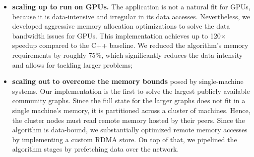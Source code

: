 \begin{itemize}
\item \textbf{scaling up to run on GPUs.}
The application is not a natural fit for GPUs, because it is data-intensive and
irregular in its data accesses. Nevertheless, we developed aggressive
memory allocation optimizations to solve the data bandwidth issues for GPUs.
This implementation achieves up to 120$\times$ speedup compared to the C++ baseline.
%
We reduced the algorithm's memory requirements by roughly 75\%, which
significantly reduces the data intensity and allows for tackling larger
problems; %

\item \textbf{scaling out to overcome the memory bounds} posed by 
single-machine systems. Our implementation is the first to solve the largest publicly available
community graphs. %
Since the full state for the larger graphs does not fit in a
single machine's memory, it is partitioned across a cluster
of machines. Hence, the cluster nodes must read
remote memory hosted by their peers. Since the algorithm is data-bound, we
substantially optimized remote memory accesses by implementing
a custom RDMA store.
On top of that, we pipelined the algorithm stages by prefetching
data over the network.
\begin{comment} Finally, the algorithm's computation
is effectively distributed across the cluster nodes and parallelized further
within each node by exploiting their multi-core CPUs.
\end{comment}

\begin{comment}
The use of pipelining makes it pointless to combine GPU acceleration
into the distributed implementation: computing for an iteration takes less
time than fetching the data from remote memory, and the computation is
fully overlapped with fulfilling the data requests for the next iteration.
\end{comment}

\end{itemize}

